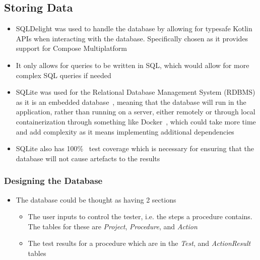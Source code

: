 \documentclass[../dissertation.tex]{subfiles}
\begin{document}
\subsection{Storing Data}
\begin{itemize}
  \item SQLDelight was used to handle the database by allowing for typesafe Kotlin APIs when interacting with the database.
    Specifically chosen as it provides support for Compose Multiplatform~\cite{sqldelight}
  \item It only allows for queries to be written in SQL, which would allow for more complex SQL queries if needed
  \item SQLite was used for the Relational Database Management System (RDBMS) as it is an embedded database~\cite{sqlite:about},
    meaning that the database will run in the application, rather than running on a server,
    either remotely or through local containerization through something like Docker~\cite{docker:container},
    which could take more time and add complexity as it means implementing additional dependencies
  \item SQLite also has 100\%~\cite{sqlite:tests} test coverage which is necessary for ensuring that the database will
    not cause artefacts to the results
\end{itemize}

\subsubsection{Designing the Database}
\begin{itemize}
  \item The database could be thought as having 2 sections
    \begin{itemize}
      \item The user inputs to control the tester, i.e. the steps a procedure contains.
        The tables for these are \textit{Project}, \textit{Procedure}, and \textit{Action}
      \item The test results for a procedure which are in the \textit{Test}, and \textit{ActionResult} tables
    \end{itemize}
\end{itemize}
\end{document}
